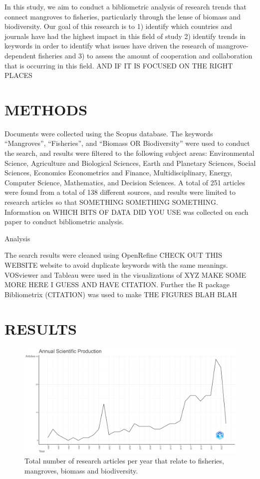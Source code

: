 \documentclass[
  12pt,
]{article}
\begin{document}
In this study, we aim to conduct a bibliometric analysis of research trends that connect mangroves to fisheries, particularly through the lense of biomass and biodiversity. Our goal of this research is to 1) identify which countries and journals have had the highest impact in this field of study 2) identify trends in keywords in order to identify what issues have driven the research of mangrove-dependent fisheries and 3) to assess the amount of cooperation and collaboration that is occurring in this field. AND IF IT IS FOCUSED ON THE RIGHT PLACES

\hypertarget{methods}{%
\section{METHODS}\label{methods}}

Documents were collected using the Scopus database. The keywords ``Mangroves'', ``Fisheries'', and ``Biomass OR Biodiversity'' were used to conduct the search, and results were filtered to the following subject areas: Environmental Science, Agriculture and Biological Sciences, Earth and Planetary Sciences, Social Sciences, Economics Econometrics and Finance, Multidisciplinary, Energy, Computer Science, Mathematics, and Decision Sciences. A total of 251 articles were found from a total of 138 different sources, and results were limited to research articles so that SOMETHING SOMETHING SOMETHING. Information on WHICH BITS OF DATA DID YOU USE was collected on each paper to conduct bibliometric analysis.

Analysis

The search results were cleaned using OpenRefine CHECK OUT THIS WEBSITE website to avoid duplicate keywords with the same meanings. VOSviewer and Tableau were used in the visualizations of XYZ MAKE SOME MORE HERE I GUESS AND HAVE CITATION. Further the R package Bibliometrix (CITATION) was used to make THE FIGURES BLAH BLAH

\hypertarget{results}{%
\section{RESULTS}\label{results}}

\begin{figure}
\includegraphics[width=1\linewidth]{AnnualScientificProduction} \caption{Total number of research articles per year that relate to fisheries, mangroves, biomass and biodiversity. \label{AnnualScientificProduction}}\label{fig:AnnualScientificProduction}
\end{figure}
\end{document}
